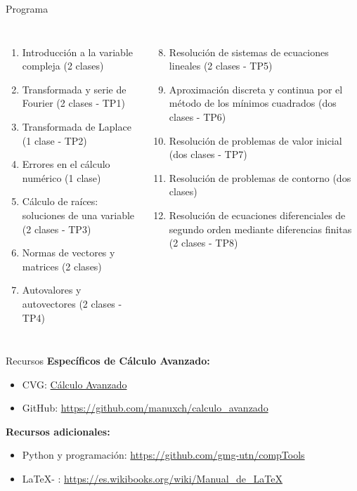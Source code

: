 \documentclass[9pt, aspectratio=169]{beamer}
\begin{document}
\begin{frame}{Programa}
\begin{columns}[t]
\cx 
\begin{enumerate}
    \item Introducción a la variable compleja (2 clases)
    \item Transformada y serie de Fourier (2 clases - TP1)
    \item Transformada de Laplace (1 clase - TP2)
    \item Errores en el cálculo numérico (1 clase)
    \item Cálculo de raíces: soluciones de una variable (2 clases - TP3)
    \item Normas de vectores y matrices (2 clases)
    \item Autovalores y autovectores (2 clases - TP4)
\end{enumerate}
\cx 
\begin{enumerate}
    \setcounter{enumi}{7}
    \item Resolución de sistemas de ecuaciones lineales (2 clases - TP5)
    \item Aproximación discreta y continua por el método de los mínimos cuadrados (dos clases - TP6)
    \item Resolución de problemas de valor inicial (dos clases - TP7)
    \item Resolución de problemas de contorno (dos clases)
    \item Resolución de ecuaciones diferenciales de segundo orden mediante diferencias finitas (2 clases - TP8)
\end{enumerate}
\end{columns}
\vspace{1em}
\begin{columns}[c]
\cx
\centering
{}

\cx
\centering
{}
\end{columns}
\end{frame}

\begin{frame}{Recursos}
\textbf{Específicos de Cálculo Avanzado:}
\begin{itemize}
    \item CVG: \href{https://frlp.cvg.utn.edu.ar/course/view.php?id=189}{Cálculo Avanzado}
    \item GitHub: \url{https://github.com/manuxch/calculo_avanzado}
\end{itemize}

\textbf{Recursos adicionales:}
\begin{itemize}
    \item Python y programación: \url{https://github.com/gmg-utn/compTools}
    \item \LaTeX - \XeLaTeX: \url{https://es.wikibooks.org/wiki/Manual_de_LaTeX}
\end{itemize}
\end{frame}
\end{document}
